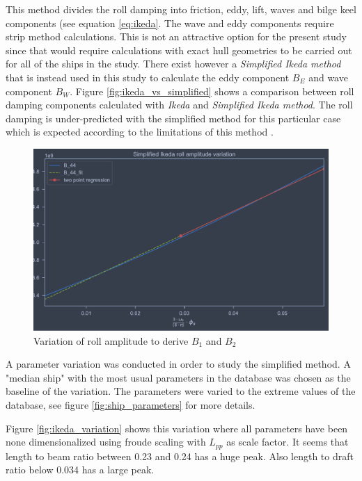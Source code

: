This method divides the roll damping into friction, eddy, lift, waves and bilge keel components (see equation \ref{eq:ikeda}. The wave and eddy components require strip method calculations. This is not an attractive option for the present study since that would require calculations with exact hull geometries to be carried out for all of the ships in the study. There exist however a \emph{Simplified Ikeda method} \cite{kawahara_simple_2011} that is instead used in this study to calculate the eddy component $B_E$ and wave component $B_W$. Figure \ref{fig:ikeda_vs_simplified} shows a comparison between roll damping components calculated with \emph{Ikeda} and \emph{Simplified Ikeda method}. The roll damping is under-predicted with the simplified method for this particular case which is expected according to the limitations of this method  \cite{kawahara_simple_2011}.

\begin{figure}[H]
    \centering
    \includegraphics[width=\columnwidth]{figures/ikeda_B_1_B_2.pdf}
    \caption{Variation of roll amplitude to derive $B_1$ and $B_2$}
    \label{fig:ikeda_B_1_B2}
\end{figure}

A parameter variation was conducted in order to study the simplified method.
A "median ship" with the most usual parameters in the database was chosen as the baseline of the variation. The parameters were varied to the extreme values of the database, see figure \ref{fig:ship_parameters} for more details. 

Figure \ref{fig:ikeda_variation} shows this variation where all parameters have been none dimensionalized using froude scaling with $L_{pp}$ as scale factor. 
It seems that length to beam ratio between 0.23 and 0.24 has a huge peak. Also length to draft ratio below 0.034 has a large peak. 


